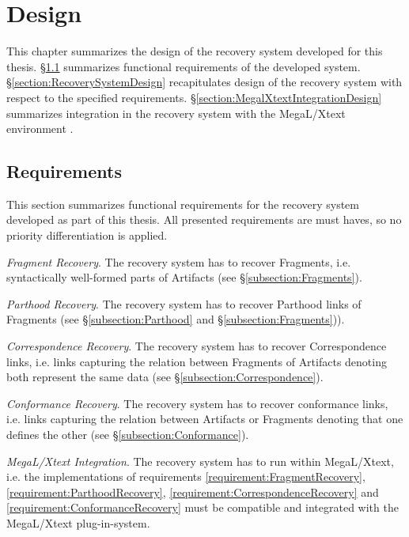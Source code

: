 \chapter{Design}
\label{chapter:Design}
This chapter summarizes the design of the recovery system developed for this thesis.
§\ref{section:Requirements} summarizes functional requirements of the developed system.
§\ref{section:RecoverySystemDesign} recapitulates design of the recovery system with respect to the specified requirements.
§\ref{section:MegalXtextIntegrationDesign} summarizes integration in the recovery system with the \gls{MegaL/Xtext} environment .

\section{Requirements}
\label{section:Requirements}
This section summarizes functional requirements for the recovery system developed as part of this thesis.
All presented requirements are must haves, so no priority differentiation is applied. 

\begin{requirements}

\item
\label{requirement:FragmentRecovery}
\textit{Fragment Recovery}.
The recovery system has to recover \glspl{Fragment}, i.e. syntactically well-formed parts of \glspl{Artifact} (see §\ref{subsection:Fragments}).

\item
\label{requirement:ParthoodRecovery}
\textit{Parthood Recovery}.
The recovery system has to recover \gls{Parthood} links of \glspl{Fragment} (see §\ref{subsection:Parthood} and §\ref{subsection:Fragments})).

\item
\label{requirement:CorrespondenceRecovery}
\textit{Correspondence Recovery}.
The recovery system has to recover \gls{Correspondence} links, i.e. links capturing the relation between \glspl{Fragment} of \glspl{Artifact} denoting both represent the same data (see §\ref{subsection:Correspondence}).

\item
\label{requirement:ConformanceRecovery} 
\textit{Conformance Recovery}.
The recovery system has to recover conformance links, i.e. links capturing the relation between \glspl{Artifact} or \glspl{Fragment} denoting that one defines the other (see §\ref{subsection:Conformance}).

\item 
\label{Requirement:Megal-Xtext}
\textit{\gls{MegaL/Xtext} Integration}.
The recovery system has to run within \gls{MegaL/Xtext}, i.e. the implementations of requirements 
\ref{requirement:FragmentRecovery},
\ref{requirement:ParthoodRecovery}, 
\ref{requirement:CorrespondenceRecovery} 
and \ref{requirement:ConformanceRecovery} must be compatible and integrated with the \gls{MegaL/Xtext} plug-in-system.

\end{requirements}

